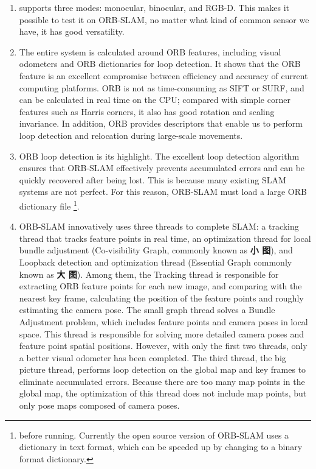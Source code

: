 \begin{enumerate}
\item supports three modes: monocular, binocular, and RGB-D. This makes it possible to test it on ORB-SLAM, no matter what kind of common sensor we have, it has good versatility.
\item The entire system is calculated around ORB features, including visual odometers and ORB dictionaries for loop detection. It shows that the ORB feature is an excellent compromise between efficiency and accuracy of current computing platforms. ORB is not as time-consuming as SIFT or SURF, and can be calculated in real time on the CPU; compared with simple corner features such as Harris corners, it also has good rotation and scaling invariance. In addition, ORB provides descriptors that enable us to perform loop detection and relocation during large-scale movements.
\item ORB loop detection is its highlight. The excellent loop detection algorithm ensures that ORB-SLAM effectively prevents accumulated errors and can be quickly recovered after being lost. This is because many existing SLAM systems are not perfect. For this reason, ORB-SLAM must load a large ORB dictionary \mbox{file} \footnote{before running. Currently the open source version of ORB-SLAM uses a dictionary in text format, which can be speeded up by changing to a binary format dictionary. }.
\item ORB-SLAM innovatively uses three threads to complete SLAM: a tracking thread that tracks feature points in real time, an optimization thread for local bundle adjustment (Co-visibility Graph, commonly known as \textbf{小 图}), and Loopback detection and optimization thread (Essential Graph commonly known as \textbf{大 图}). Among them, the Tracking thread is responsible for extracting ORB feature points for each new image, and comparing with the nearest key frame, calculating the position of the feature points and roughly estimating the camera pose. The small graph thread solves a Bundle Adjustment problem, which includes feature points and camera poses in local space. This thread is responsible for solving more detailed camera poses and feature point spatial positions. However, with only the first two threads, only a better visual odometer has been completed. The third thread, the big picture thread, performs loop detection on the global map and key frames to eliminate accumulated errors. Because there are too many map points in the global map, the optimization of this thread does not include map points, but only pose maps composed of camera poses.

\end{enumerate}
